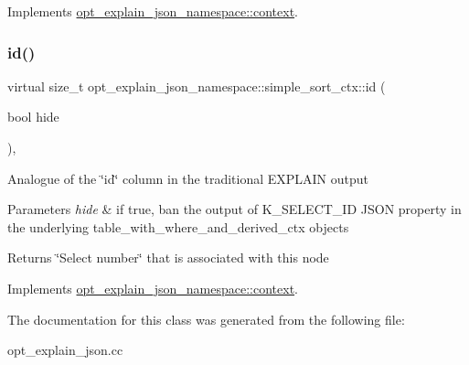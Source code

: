 Implements \mbox{\hyperlink{classopt__explain__json__namespace_1_1context}{opt\+\_\+explain\+\_\+json\+\_\+namespace\+::context}}.

\mbox{\label{classopt__explain__json__namespace_1_1simple__sort__ctx_aa375936b99b0a0bfa29fdd30f1eb860c}} 
\subsubsection{\texorpdfstring{id()}{id()}}
{\footnotesize\ttfamily virtual size\+\_\+t opt\+\_\+explain\+\_\+json\+\_\+namespace\+::simple\+\_\+sort\+\_\+ctx\+::id (\begin{DoxyParamCaption}\item[{bool}]{hide }\end{DoxyParamCaption})\hspace{0.3cm}{\ttfamily [inline]}, {\ttfamily [virtual]}}

Analogue of the \char`\"{}id\char`\"{} column in the traditional E\+X\+P\+L\+A\+IN output


\begin{DoxyParams}{Parameters}
{\em hide} & if true, ban the output of K\+\_\+\+S\+E\+L\+E\+C\+T\+\_\+\+ID J\+S\+ON property in the underlying table\+\_\+with\+\_\+where\+\_\+and\+\_\+derived\+\_\+ctx objects\\
\hline
\end{DoxyParams}
\begin{DoxyReturn}{Returns}
\char`\"{}\+Select number\char`\"{} that is associated with this node 
\end{DoxyReturn}


Implements \mbox{\hyperlink{classopt__explain__json__namespace_1_1context_a07c46bab31a35d88c13ccdca82755aaa}{opt\+\_\+explain\+\_\+json\+\_\+namespace\+::context}}.



The documentation for this class was generated from the following file\+:\begin{DoxyCompactItemize}
\item 
opt\+\_\+explain\+\_\+json.\+cc\end{DoxyCompactItemize}
